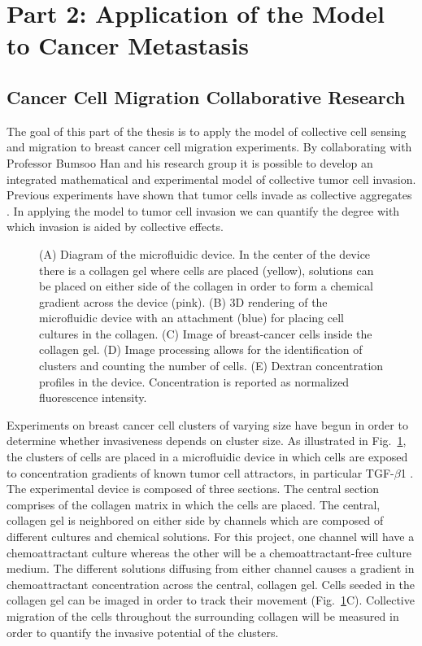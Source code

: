 \documentclass[phys,prelim]{puthesis}
\begin{document}
\section{Part 2: Application of the Model to Cancer Metastasis}

\subsection{Cancer Cell Migration Collaborative Research}

The goal of this part of the thesis is to apply the model of collective cell sensing and migration to breast cancer cell migration experiments. By collaborating with Professor Bumsoo Han and his research group it is possible to develop an integrated mathematical and experimental model of collective tumor cell invasion. Previous experiments have shown that tumor cells invade as collective aggregates \cite{cheung2013collective,friedl2012classifying}. In applying the model to tumor cell invasion we can quantify the degree with which invasion is aided by collective effects.

\begin{figure}[ht]
    \centering
    \caption{(A) Diagram of the microfluidic device. In the center of the device there is a collagen gel where cells are placed (yellow), solutions can be placed on either side of the collagen in order to form a chemical gradient across the device (pink). (B) 3D rendering of the microfluidic device with an attachment (blue) for placing cell cultures in the collagen. (C) Image of breast-cancer cells inside the collagen gel. (D) Image processing allows for the identification of clusters and counting the number of cells. (E) Dextran concentration profiles in the device. Concentration is reported as normalized fluorescence intensity.} \label{fig:exp}
\end{figure}

Experiments on breast cancer cell clusters of varying size have begun in order to determine whether invasiveness depends on cluster size. As illustrated in Fig.\ \ref{fig:exp}, the clusters of cells are placed in a microfluidic device in which cells are exposed to concentration gradients of known tumor cell attractors, in particular TGF-$\beta$1 \cite{kwak2014simulation,shin2013development}. The experimental device is composed of three sections. The central section comprises of the collagen matrix in which the cells are placed. The central, collagen gel is neighbored on either side by channels which are composed of different cultures and chemical solutions. For this project, one channel will have a chemoattractant culture whereas the other will be a chemoattractant-free culture medium. The different solutions diffusing from either channel causes a gradient in chemoattractant concentration across the central, collagen gel. Cells seeded in the collagen gel can be imaged in order to track their movement (Fig.\ \ref{fig:exp}C). Collective migration of the cells throughout the surrounding collagen will be measured in order to quantify the invasive potential of the clusters.
\end{document}
